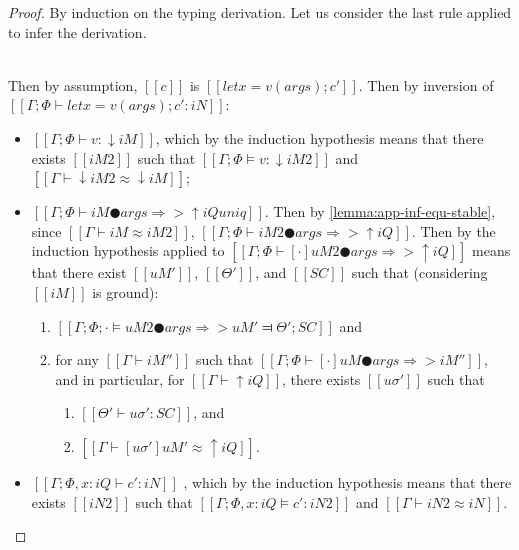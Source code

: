 \begin{proof}
    By induction on the typing derivation.
    Let us consider the last rule applied to infer the derivation.
    \begin{caseof}

        \item {}\\
            Then by assumption, 
            $[[c]]$ is $[[let x = v(args); c']]$. Then by inversion of
            $[[Γ ; Φ ⊢ let x = v(args); c' : iN]]$: 
            \begin{itemize}
                \item $[[Γ ; Φ ⊢ v : ↓iM]]$, 
                    which by the induction hypothesis means 
                    that there exists $[[iM2]]$ such that
                    $[[Γ; Φ ⊨ v : ↓iM2]]$ and $[[Γ ⊢ ↓iM2 ≈ ↓iM]]$;
                \item $[[Γ ; Φ ⊢ iM ● args ⇒> ↑iQ uniq]]$. 
                    Then by \cref{lemma:app-inf-equ-stable}, since 
                    $[[Γ ⊢ iM ≈ iM2]]$,
                    $[[Γ ; Φ ⊢ iM2 ● args ⇒> ↑iQ]]$.
                    Then by the induction hypothesis applied to 
                    $[[Γ ; Φ ⊢ [·]uM2 ● args ⇒> ↑iQ]]$
                    means that there exist $[[uM']]$, $[[Θ']]$, and $[[SC]]$ such that
                    (considering $[[iM]]$ is ground):
                    \begin{enumerate}
                        \item $[[ Γ; Φ; · ⊨ uM2 ● args ⇒> uM' ⫤ Θ'; SC ]]$ and
                        \item for any  $[[Γ ⊢ iM'']]$
                            such that $[[Γ; Φ ⊢ [·]uM ● args ⇒> iM'']]$,
                            and in particular, for $[[Γ ⊢ ↑iQ]]$,
                            there exists $[[uσ']]$ such that 
                            \begin{enumerate}
                                \item $[[Θ' ⊢ uσ' : SC]]$, and 
                                \item $[[Γ ⊢ [uσ']uM' ≈ ↑iQ]]$.
                            \end{enumerate}
                    \end{enumerate}
                \item $[[Γ; Φ, x:iQ ⊢ c' : iN]]$
                    \label{point:typing-completeness:AppLet:body},
                    which by the induction hypothesis means
                    that there exists $[[iN2]]$ such that
                    $[[Γ; Φ, x:iQ ⊨ c' : iN2]]$ and $[[Γ ⊢ iN2 ≈ iN]]$.
            \end{itemize}


\end{caseof}
\end{proof}
